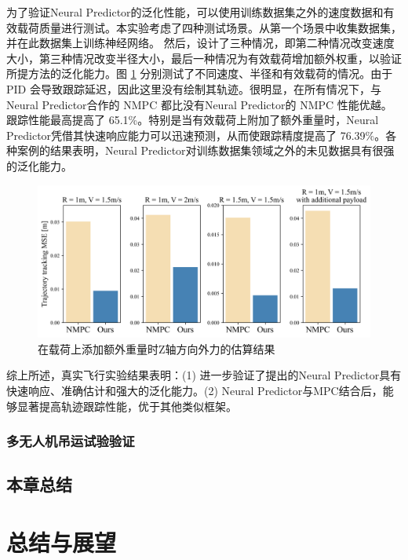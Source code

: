 \documentclass[lang=chs, degree=master, blindreview=false, winfonts=true]{yanputhesis}
\begin{document}
为了验证Neural Predictor的泛化性能，可以使用训练数据集之外的速度数据和有效载荷质量进行测试。本实验考虑了四种测试场景。从第一个场景中收集数据集，并在此数据集上训练神经网络。 然后，设计了三种情况，即第二种情况改变速度大小，第三种情况改变半径大小，最后一种情况为有效载荷增加额外权重，以验证所提方法的泛化能力。图 \ref{prediction_res} 分别测试了不同速度、半径和有效载荷的情况。由于 PID 会导致跟踪延迟，因此这里没有绘制其轨迹。很明显，在所有情况下，与Neural Predictor合作的 NMPC 都比没有Neural Predictor的 NMPC 性能优越。跟踪性能最高提高了 65.1\%。特别是当有效载荷上附加了额外重量时，Neural Predictor凭借其快速响应能力可以迅速预测，从而使跟踪精度提高了 76.39\%。各种案例的结果表明，Neural Predictor对训练数据集领域之外的未见数据具有很强的泛化能力。
\begin{figure}[hbt!]
	\centering
	\includegraphics[width=38pc]{picture/kk/prediction_res.png} 
	\caption{在载荷上添加额外重量时Z轴方向外力的估算结果} 
	\label{prediction_res}
\end{figure}

综上所述，真实飞行实验结果表明：(1) 进一步验证了提出的Neural Predictor具有快速响应、准确估计和强大的泛化能力。(2) Neural Predictor与MPC结合后，能够显著提高轨迹跟踪性能，优于其他类似框架。

\subsection{多无人机吊运试验验证}

\section{本章总结}


\cleardoublepage

\chapter{总结与展望}
\end{document}
